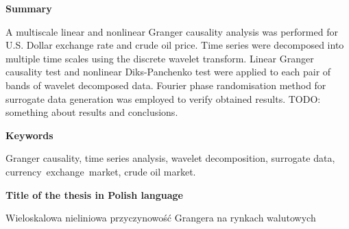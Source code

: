 \newpage
\begin{center}
\textbf{Summary}
\end{center}

A multiscale linear and nonlinear Granger causality analysis was performed for U.S. Dollar exchange rate and crude oil price.
Time series were decomposed into multiple time scales using the discrete wavelet transform.
Linear Granger causality test and nonlinear Diks-Panchenko test were applied to each pair of bands of wavelet decomposed data.
Fourier phase randomisation method for surrogate data generation was employed to verify obtained results.
TODO: something about results and conclusions.
\vspace{2.5cm}
\begin{center}

\textbf{Keywords}\vspace{0.3cm}

Granger causality, time series analysis, wavelet decomposition, surrogate data, \mbox{currency exchange market}, crude oil market.\\
\vspace{2.5cm}

\textbf{Title of the thesis in Polish language}\vspace{0.3cm}

Wieloskalowa nieliniowa przyczynowość Grangera na rynkach walutowych
\end{center}

